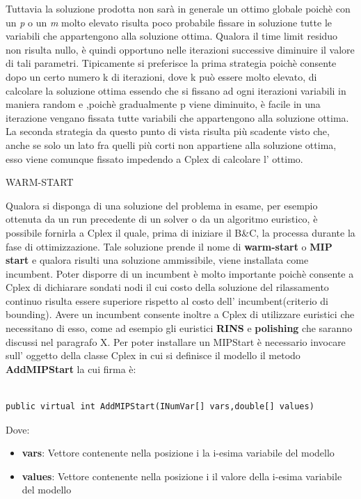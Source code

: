 \documentclass[11pt]{article}
\begin{document}
Tuttavia la soluzione prodotta non sarà in generale un ottimo globale poichè con un \textit{p} o un \textit{m} molto elevato risulta poco probabile fissare in soluzione tutte le variabili che appartengono alla soluzione ottima. 
Qualora il time limit residuo non risulta nullo, è quindi opportuno nelle iterazioni successive diminuire il valore di tali parametri. Tipicamente si preferisce la prima strategia poichè consente dopo un certo numero k di iterazioni, dove k può essere molto elevato, di calcolare la soluzione ottima essendo che si fissano ad ogni iterazioni variabili in maniera random e ,poichè gradualmente p viene diminuito, è facile in una iterazione vengano fissata tutte variabili che appartengono alla soluzione ottima. La seconda strategia da questo punto di vista risulta più scadente visto che, anche se solo un lato fra quelli più corti non appartiene alla soluzione ottima, esso viene comunque fissato impedendo a Cplex di calcolare l' ottimo.

\vspace{2\baselineskip} 
WARM-START
\vspace{2\baselineskip} 

Qualora si disponga di una soluzione del problema in esame, per esempio ottenuta da un run precedente di un solver o da un algoritmo euristico, è possibile fornirla a Cplex il quale, prima di iniziare il B&C, la processa durante la fase di ottimizzazione. Tale soluzione prende il nome di  \textbf{warm-start} o \textbf{MIP start} e qualora risulti una soluzione ammissibile, viene installata come incumbent. 
Poter disporre di un incumbent è molto importante poichè consente a Cplex di dichiarare sondati nodi il cui costo della soluzione del rilassamento continuo risulta essere superiore rispetto al costo dell' incumbent(criterio di bounding). Avere un incumbent consente inoltre a Cplex di utilizzare euristici che necessitano di esso, come ad esempio gli euristici \textbf{RINS} e \textbf{polishing} che saranno discussi nel paragrafo X. Per poter installare un MIPStart è necessario invocare sull' oggetto della classe Cplex in cui si definisce il modello il metodo \textbf{AddMIPStart} la cui firma è:

\begin{lstlisting}

public virtual int AddMIPStart(INumVar[] vars,double[] values)

\end{lstlisting}

Dove:

\begin{itemize}
    \item \textbf{vars}: Vettore contenente nella posizione i la i-esima variabile del modello
    \item \textbf{values}: Vettore contenente nella posizione i il valore della i-esima variabile del modello
\end{itemize}
\end{document}

